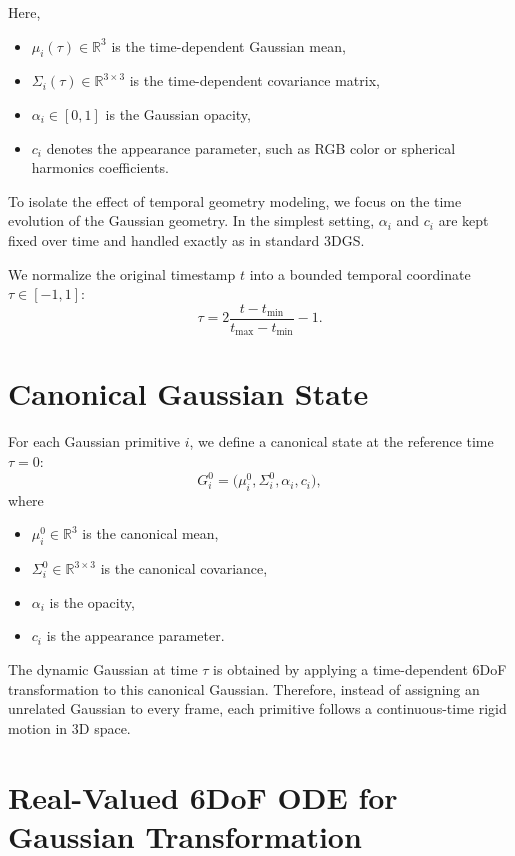 \documentclass[11pt]{article}
\begin{document}
Here,
\begin{itemize}[leftmargin=1.5em]
\item $\mu_i(\tau)\in\mathbb{R}^3$ is the time-dependent Gaussian mean,
\item $\Sigma_i(\tau)\in\mathbb{R}^{3\times 3}$ is the time-dependent covariance matrix,
\item $\alpha_i\in[0,1]$ is the Gaussian opacity,
\item $c_i$ denotes the appearance parameter, such as RGB color or spherical harmonics coefficients.
\end{itemize}

To isolate the effect of temporal geometry modeling, we focus on the time evolution of the Gaussian geometry. In the simplest setting, $\alpha_i$ and $c_i$ are kept fixed over time and handled exactly as in standard 3DGS.

We normalize the original timestamp $t$ into a bounded temporal coordinate $\tau\in[-1,1]$:
\begin{equation}
\tau = 2\frac{t-t_{\min}}{t_{\max}-t_{\min}}-1.
\end{equation}

\section{Canonical Gaussian State}

For each Gaussian primitive $i$, we define a canonical state at the reference time $\tau=0$:
\begin{equation}
G_i^0=\bigl(\mu_i^0,\Sigma_i^0,\alpha_i,c_i\bigr),
\end{equation}
where
\begin{itemize}[leftmargin=1.5em]
\item $\mu_i^0\in\mathbb{R}^3$ is the canonical mean,
\item $\Sigma_i^0\in\mathbb{R}^{3\times 3}$ is the canonical covariance,
\item $\alpha_i$ is the opacity,
\item $c_i$ is the appearance parameter.
\end{itemize}

The dynamic Gaussian at time $\tau$ is obtained by applying a time-dependent 6DoF transformation to this canonical Gaussian. Therefore, instead of assigning an unrelated Gaussian to every frame, each primitive follows a continuous-time rigid motion in 3D space.

\section{Real-Valued 6DoF ODE for Gaussian Transformation}
\end{document}
